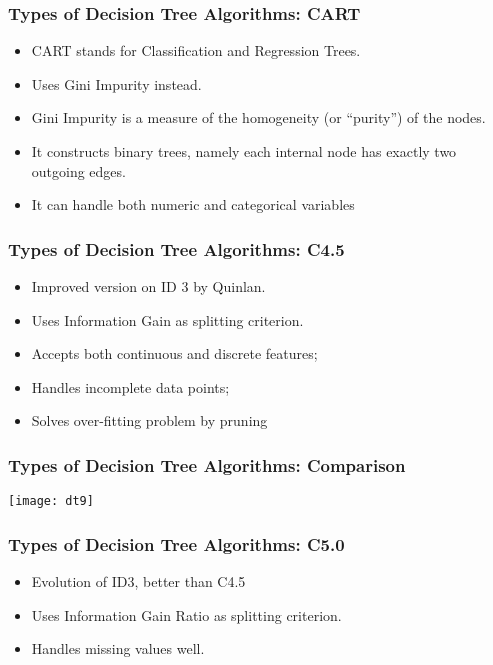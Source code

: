 \begin{frame}[fragile] \frametitle{Types of Decision Tree Algorithms: CART}
\begin{itemize}
\item CART stands for Classification and Regression Trees.
\item Uses Gini Impurity instead. 
\item Gini Impurity is a measure of the homogeneity (or ``purity'') of the nodes.
\item It constructs binary trees, namely each internal node has exactly two outgoing edges.
\item It can handle both numeric and categorical variables 
\end{itemize}
\end{frame}

\begin{frame}[fragile] \frametitle{Types of Decision Tree Algorithms: C4.5}
\begin{itemize}
\item Improved version on ID 3 by Quinlan. 
\item Uses Information Gain as splitting criterion. 
\item Accepts both continuous and discrete features;
\item Handles incomplete data points; 
\item Solves over-fitting problem by pruning
\end{itemize}
\end{frame}

\begin{frame}[fragile] \frametitle{Types of Decision Tree Algorithms: Comparison}
\begin{center}
\texttt{[image: dt9]}
\end{center}
\end{frame}


\begin{frame}[fragile] \frametitle{Types of Decision Tree Algorithms: C5.0}
\begin{itemize}
\item Evolution of ID3, better than C4.5
\item Uses Information Gain Ratio as splitting criterion. 
\item Handles missing values well.
\end{itemize}
\end{frame}


